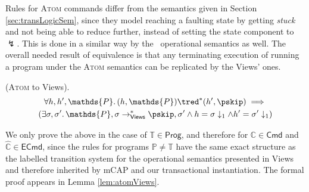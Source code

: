 Rules for \textsc{Atom} commands differ from the semantics given in Section \ref{sec:transLogicSem}, since they model reaching a faulting state by getting \textit{stuck} and not being able to reduce further, instead of setting the state component to $\lightning$. This is done in a similar way by the \tpl\ operational semantics as well. The overall needed result of equivalence is that any terminating execution of running a program under the \textsc{Atom} semantics can be replicated by the Views' ones. \\

\begin{thm}
	\label{thm:atomViewsProg}
	(\textsc{Atom} to Views).
	\begin{gather*}
		\forall h, h', \mathds{P} \ldotp
		(h, \mathds{P}) \tred^* (h', \pskip)
		\implies \\
		\left(		
			\exists \sigma, \sigma' \ldotp
			\mathds{P}, \sigma \rightarrow^*_{\mathsf{Views}} \pskip, \sigma'
			\land h = \sigma \downarrow_1 \land h' = \sigma' \downarrow_1
		\right)
	\end{gather*}
\end{thm}

We only prove the above in the case of $\mathds{T} \in \mathsf{Prog}$, and therefore for $\mathds{C} \in \mathsf{Cmd}$ and $\hat{\mathds{C}} \in \mathsf{ECmd}$, since the rules for programs $\mathds{P} \neq \mathds{T}$ have the same exact structure as the labelled transition system for the operational semantics presented in Views and therefore inherited by mCAP and our transactional instantiation. The formal proof appears in Lemma \ref{lem:atomViews}.